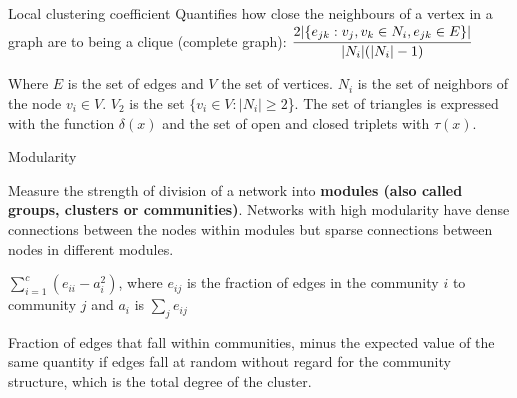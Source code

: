 \documentclass{beamer}
\begin{document}
    \begin{frame}

        \begin{block}{Local clustering coefficient}
            Quantifies how close the neighbours of a vertex in a graph are to being a clique (complete graph): $\cfrac{2|\{e_{jk} : v_j, v_k \in N_i, e_{jk} \in E\}|}{|N_i|(|N_i| - 1)}$
        \end{block}

        \begin{block}{}
            Where $E$ is the set of edges and $V$ the set of vertices. $N_i$ is the set of neighbors of the node $v_i \in V$. $V_2$ is the set $\{v_i \in V: |N_i| \geq 2$\}.
            The set of triangles is expressed with the function $\delta(x)$ and the set of open and closed triplets with $\tau(x)$.
        \end{block}

    \end{frame}

    \begin{frame}{Modularity}
        \begin{block}{}
            Measure the strength of division of a network into \textbf{modules (also called groups, clusters or communities)}.
            Networks with high modularity have dense connections between the nodes within modules but sparse connections between nodes in different modules.
        \end{block}
        \begin{block}{}
            $\sum_{i=1}^{c}(e_{ii} - a_{i}^{2})$, where $e_{ij}$ is the fraction of edges in the community $i$ to community $j$ and $a_i$ is $\sum_je_{ij}$
        \end{block}

        \begin{block}{}
            Fraction of edges that fall within communities, minus the expected value of the same quantity if edges fall at random without regard for the community structure, which is the total degree of the cluster.
        \end{block}
    \end{frame}
\end{document}
